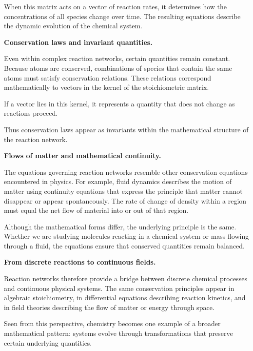 \documentclass[11pt, openany]{book}
\theoremstyle{plain}
\theoremstyle{definition}
\theoremstyle{remark}
\begin{document}
When this matrix acts on a vector of reaction rates, it determines how
the concentrations of all species change over time. The resulting
equations describe the dynamic evolution of the chemical system.

\medskip

\textbf{Conservation laws and invariant quantities.}

Even within complex reaction networks, certain quantities remain
constant. Because atoms are conserved, combinations of species that
contain the same atoms must satisfy conservation relations. These
relations correspond mathematically to vectors in the kernel of the
stoichiometric matrix.

If a vector lies in this kernel, it represents a quantity that does not
change as reactions proceed.

Thus conservation laws appear as invariants within the mathematical
structure of the reaction network.

\medskip

\textbf{Flows of matter and mathematical continuity.}

The equations governing reaction networks resemble other conservation
equations encountered in physics. For example, fluid dynamics describes
the motion of matter using continuity equations that express the
principle that matter cannot disappear or appear spontaneously. The rate
of change of density within a region must equal the net flow of material
into or out of that region.

Although the mathematical forms differ, the underlying principle is the
same. Whether we are studying molecules reacting in a chemical system or
mass flowing through a fluid, the equations ensure that conserved
quantities remain balanced.

\medskip

\textbf{From discrete reactions to continuous fields.}

Reaction networks therefore provide a bridge between discrete chemical
processes and continuous physical systems. The same conservation
principles appear in algebraic stoichiometry, in differential equations
describing reaction kinetics, and in field theories describing the flow
of matter or energy through space.

Seen from this perspective, chemistry becomes one example of a broader
mathematical pattern: systems evolve through transformations that
preserve certain underlying quantities.

\medskip
\end{document}
